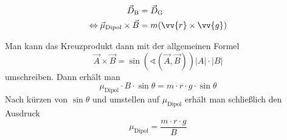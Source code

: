     
\begin{align*}
    \label{eqn:Drehmoment_Gleichgewicht}
    \vec{D}_{\text{B}} &= \vec{D}_{\text{G}} \\
    \Leftrightarrow \vec{\mu}_{\text{Dipol}} \times \vec{B} &= m(\vv{r} \times \vv{g})
\end{align*}

Man kann das Kreuzprodukt dann mit der allgemeinen Formel 
\begin{equation}
    \label{eqn:Kreuzprodukt}
    \vec{A} \times \vec{B} = \sin(\sphericalangle(\vec{A},\vec{B}))\lvert A \rvert \cdot\lvert B \rvert
\end{equation}
umschreiben. Dann erhält man
\begin{equation}
    \label{eqn:Drehmoment_Gleichgewicht1}
    \mu_{\text{Dipol}}\cdot B\cdot \sin\theta = m\cdot r\cdot g\cdot\sin\theta
\end{equation}
Nach kürzen von $\sin\theta$ und umstellen auf $\mu_{\text{Dipol}}$ erhält man schließlich den Ausdruck
\begin{equation}
    \label{eqn:Drehmoment_Gleichgewicht2}
    \mu_{\text{Dipol}} = \frac{m \cdot r\cdot g}{B} 
\end{equation}


